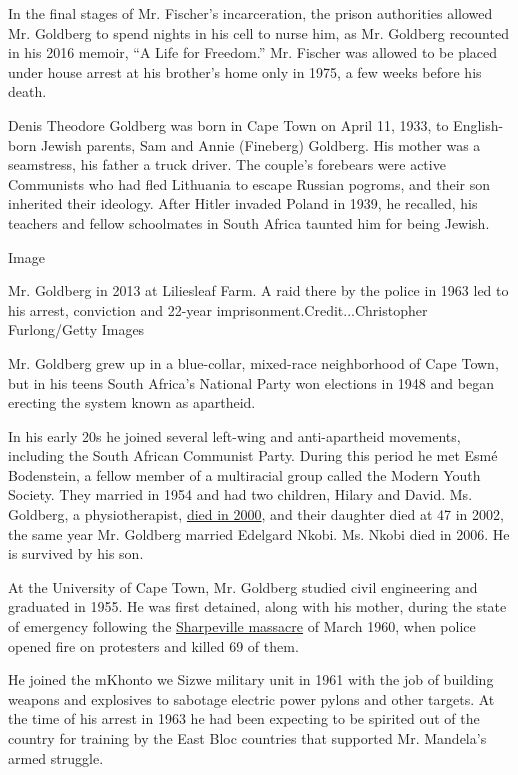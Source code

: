 In the final stages of Mr. Fischer's incarceration, the prison
authorities allowed Mr. Goldberg to spend nights in his cell to nurse
him, as Mr. Goldberg recounted in his 2016 memoir, ``A Life for
Freedom.'' Mr. Fischer was allowed to be placed under house arrest at
his brother's home only in 1975, a few weeks before his death.

Denis Theodore Goldberg was born in Cape Town on April 11, 1933, to
English-born Jewish parents, Sam and Annie (Fineberg) Goldberg. His
mother was a seamstress, his father a truck driver. The couple's
forebears were active Communists who had fled Lithuania to escape
Russian pogroms, and their son inherited their ideology. After Hitler
invaded Poland in 1939, he recalled, his teachers and fellow schoolmates
in South Africa taunted him for being Jewish.

Image

Mr. Goldberg in 2013 at Liliesleaf Farm. A raid there by the police in
1963 led to his arrest, conviction and 22-year
imprisonment.Credit...Christopher Furlong/Getty Images

Mr. Goldberg grew up in a blue-collar, mixed-race neighborhood of Cape
Town, but in his teens South Africa's National Party won elections in
1948 and began erecting the system known as apartheid.

In his early 20s he joined several left-wing and anti-apartheid
movements, including the South African Communist Party. During this
period he met Esmé Bodenstein, a fellow member of a multiracial group
called the Modern Youth Society. They married in 1954 and had two
children, Hilary and David. Ms. Goldberg, a physiotherapist,
\href{https://www.theguardian.com/news/2000/mar/08/guardianobituaries}{died
in 2000}, and their daughter died at 47 in 2002, the same year Mr.
Goldberg married Edelgard Nkobi. Ms. Nkobi died in 2006. He is survived
by his son.

At the University of Cape Town, Mr. Goldberg studied civil engineering
and graduated in 1955. He was first detained, along with his mother,
during the state of emergency following the
\href{https://www.sahistory.org.za/article/sharpeville-massacre-21-march-1960}{Sharpeville
massacre} of March 1960, when police opened fire on protesters and
killed 69 of them.

He joined the mKhonto we Sizwe military unit in 1961 with the job of
building weapons and explosives to sabotage electric power pylons and
other targets. At the time of his arrest in 1963 he had been expecting
to be spirited out of the country for training by the East Bloc
countries that supported Mr. Mandela's armed struggle.

